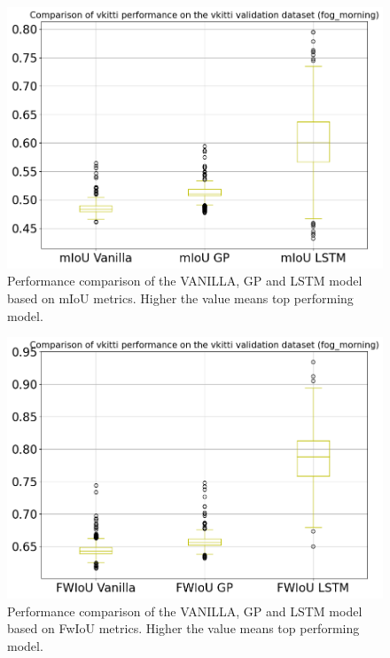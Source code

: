 	\begin{figure}
		\centering
		
		\includegraphics[width=13cm]{images/two_vkitti_mIoU.png}
		\caption{Performance comparison of the VANILLA, GP and LSTM model based on mIoU metrics. Higher the value means top performing model.}
		\label{fig:performance_metric_vkitti_two_class_box_plot}
	\end{figure}

	\begin{figure}
		\centering
	
		\includegraphics[width=13cm]{images/two_vkitti_FwIoU.png}
		\caption{Performance comparison of the VANILLA, GP and LSTM model based on FwIoU metrics. Higher the value means top performing model.}
		\label{fig:performance_metric_vkitti_two_class_box_plot}
	\end{figure}

